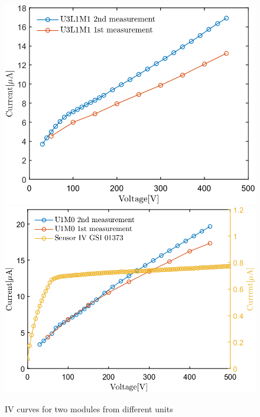 \begin{figure}[h!]
\centering
\includegraphics[width=0.47\columnwidth]{Chapter6/DCS/images/IV/U3L1FEB3.png}
\includegraphics[width=0.49\columnwidth]{Chapter6/DCS/images/IV/U1FEB1.png}
\caption{IV curves for two modules from different units}
\label{fig_U1FEB1}
\end{figure}
